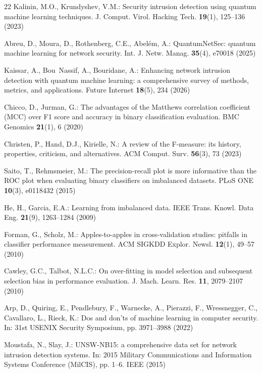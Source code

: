 \documentclass[runningheads]{llncs}
\begin{document}
\begin{thebibliography}{22}
Kalinin, M.O., Krundyshev, V.M.: Security intrusion detection using quantum
  machine learning techniques. J. Comput. Virol. Hacking Tech.
  \textbf{19}(1), 125--136 (2023)

Abreu, D., Moura, D., Rothenberg, C.E., Abel\'em, A.: QuantumNetSec: quantum
  machine learning for network security. Int. J. Netw. Manag.
  \textbf{35}(4), e70018 (2025)

Kaissar, A., Bou~Nassif, A., Bouridane, A.: Enhancing network intrusion
  detection with quantum machine learning: a comprehensive survey of
  methods, metrics, and applications. Future Internet \textbf{18}(5), 234
  (2026)

Chicco, D., Jurman, G.: The advantages of the Matthews correlation
  coefficient (MCC) over F1 score and accuracy in binary classification
  evaluation. BMC Genomics \textbf{21}(1), 6 (2020)

Christen, P., Hand, D.J., Kirielle, N.: A review of the F-measure: its
  history, properties, criticism, and alternatives. ACM Comput. Surv.
  \textbf{56}(3), 73 (2023)

Saito, T., Rehmsmeier, M.: The precision-recall plot is more informative than
  the ROC plot when evaluating binary classifiers on imbalanced datasets.
  PLoS ONE \textbf{10}(3), e0118432 (2015)

He, H., Garcia, E.A.: Learning from imbalanced data. IEEE Trans. Knowl. Data
  Eng. \textbf{21}(9), 1263--1284 (2009)

Forman, G., Scholz, M.: Apples-to-apples in cross-validation studies:
  pitfalls in classifier performance measurement. ACM SIGKDD Explor. Newsl.
  \textbf{12}(1), 49--57 (2010)

Cawley, G.C., Talbot, N.L.C.: On over-fitting in model selection and
  subsequent selection bias in performance evaluation. J. Mach. Learn. Res.
  \textbf{11}, 2079--2107 (2010)

Arp, D., Quiring, E., Pendlebury, F., Warnecke, A., Pierazzi, F.,
  Wressnegger, C., Cavallaro, L., Rieck, K.: Dos and don'ts of machine
  learning in computer security. In: 31st USENIX Security Symposium,
  pp. 3971--3988 (2022)

Moustafa, N., Slay, J.: UNSW-NB15: a comprehensive data set for network
  intrusion detection systems. In: 2015 Military Communications and
  Information Systems Conference (MilCIS), pp. 1--6. IEEE (2015)

\end{thebibliography}
\end{document}
